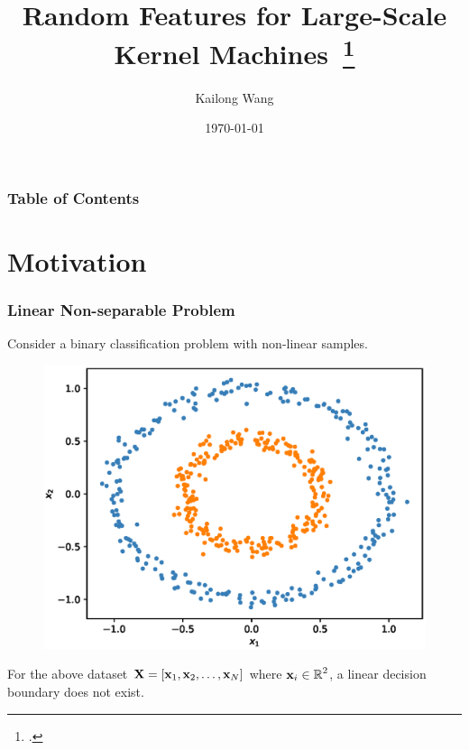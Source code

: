 \documentclass[10pt]{../Formats/RU}
\title[Random Fourier Feature]{Random Features for Large-Scale Kernel Machines~\footcite{NIPS2007_013a006f}
}
\author[Kai] %
{Kailong Wang\inst{1}
}
\institute[Rutgers] %
{
  \inst{1}%
  Rutgers University
}
\date[\today] %
{
  \today}
\begin{document}
\frame{\titlepage}
\begin{frame}
\frametitle{Table of Contents}
\tableofcontents
\end{frame}



\section{Motivation}
\begin{frame}
  \frametitle{Linear Non-separable Problem}
  Consider a binary classification problem with non-linear samples.
  \begin{figure}
    \includegraphics[height=0.5\textheight]{./figs/2d_poly_circle.eps}%
  \end{figure}
  \eg For the above dataset $\mathbf{X}=[\mathbf{x}_1, \mathbf{x}_2, \ldots, \mathbf{x}_N]$ where $\mathbf{x}_i\in \operatorname{\mathbb{R}}^2$, a linear decision boundary does not exist.
\end{frame}
\end{document}
